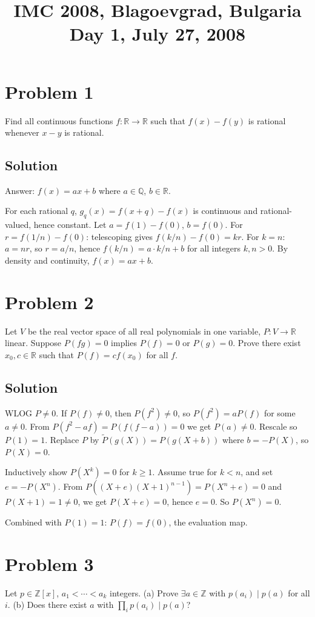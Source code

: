 \documentclass{article}
\title{IMC 2008, Blagoevgrad, Bulgaria \\ Day 1, July 27, 2008}
\date{}
\begin{document}
\maketitle

\section*{Problem 1}
Find all continuous functions $f : \mathbb{R} \to \mathbb{R}$ such that $f(x) - f(y)$ is rational whenever $x - y$ is rational.

\subsection*{Solution}
Answer: $f(x) = ax + b$ where $a \in \mathbb{Q}$, $b \in \mathbb{R}$.

For each rational $q$, $g_q(x) = f(x + q) - f(x)$ is continuous and rational-valued, hence constant. Let $a = f(1) - f(0)$, $b = f(0)$. For $r = f(1/n) - f(0)$: telescoping gives $f(k/n) - f(0) = kr$. For $k = n$: $a = nr$, so $r = a/n$, hence $f(k/n) = a \cdot k/n + b$ for all integers $k, n > 0$. By density and continuity, $f(x) = ax + b$.

\section*{Problem 2}
Let $V$ be the real vector space of all real polynomials in one variable, $P : V \to \mathbb{R}$ linear. Suppose $P(fg) = 0$ implies $P(f) = 0$ or $P(g) = 0$. Prove there exist $x_0, c \in \mathbb{R}$ such that $P(f) = c f(x_0)$ for all $f$.

\subsection*{Solution}
WLOG $P \ne 0$. If $P(f) \ne 0$, then $P(f^2) \ne 0$, so $P(f^2) = a P(f)$ for some $a \ne 0$. From $P(f^2 - af) = P(f(f-a)) = 0$ we get $P(a) \ne 0$. Rescale so $P(1) = 1$. Replace $P$ by $\tilde P(g(X)) = P(g(X+b))$ where $b = -P(X)$, so $P(X) = 0$.

Inductively show $P(X^k) = 0$ for $k \ge 1$. Assume true for $k < n$, and set $e = -P(X^n)$. From $P((X+e)(X+1)^{n-1}) = P(X^n + e) = 0$ and $P(X + 1) = 1 \ne 0$, we get $P(X + e) = 0$, hence $e = 0$. So $P(X^n) = 0$.

Combined with $P(1) = 1$: $P(f) = f(0)$, the evaluation map.

\section*{Problem 3}
Let $p \in \mathbb{Z}[x]$, $a_1 < \cdots < a_k$ integers. (a) Prove $\exists a \in \mathbb{Z}$ with $p(a_i) \mid p(a)$ for all $i$. (b) Does there exist $a$ with $\prod_i p(a_i) \mid p(a)$?
\end{document}
